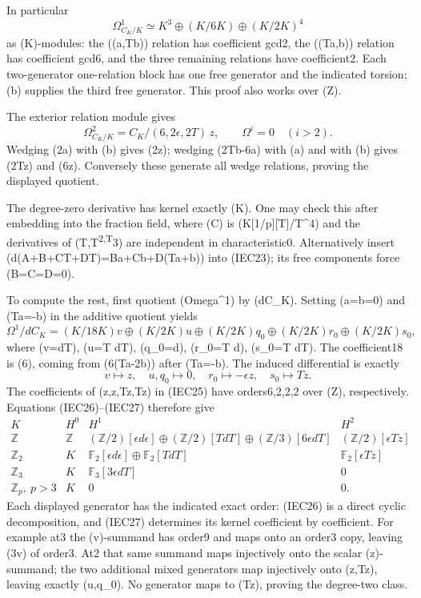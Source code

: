 \documentclass[
  10pt,
]{article}
\begin{document}
In particular \[
\Omega^1_{C_K/K}\simeq K^3\oplus(K/6K)\oplus(K/2K)^4
\tag{IEC24}
\] as (K)-modules: the ((a,Tb)) relation has coefficient gcd2, the
((Ta,\epsilon b)) relation has coefficient gcd6, and the three remaining
relations have coefficient2. Each two-generator one-relation block has
one free generator and the indicated torsion; (b) supplies the third
free generator. This proof also works over (\mathbb Z).

The exterior relation module gives \[
\Omega^2_{C_K/K}=C_K/(6,2\epsilon,2T)\,z,
\qquad\Omega^i=0\quad(i>2).
\tag{IEC25}
\] Wedging (2\epsilon a) with (b) gives (2\epsilon z); wedging (2Tb-6a)
with (a) and with (b) gives (2Tz) and (6z). Conversely these generate
all wedge relations, proving the displayed quotient.

The degree-zero derivative has kernel exactly (K). One may check this
after embedding into the fraction field, where (C) is
(K{[}1/p{]}{[}T{]}/T\^{}4) and the derivatives of
(T,T\textsuperscript{2,T}3) are independent in characteristic0.
Alternatively insert
(d(A+B\epsilon+CT+D\epsilon T)=Ba+Cb+D(Ta+\epsilon b)) into (IEC23); its
free components force (B=C=D=0).

To compute the rest, first quotient (Omega\^{}1) by (dC\_K). Setting
(a=b=0) and (Ta=-\epsilon b) in the additive quotient yields \[
\Omega^1/dC_K=(K/18K)v\oplus(K/2K)u\oplus(K/2K)q_0
\oplus(K/2K)r_0\oplus(K/2K)s_0,
\tag{IEC26}
\] where (v=\epsilon dT), (u=T dT), (q\_0=\epsilon d\epsilon),
(r\_0=\epsilon T d\epsilon), (s\_0=\epsilon T dT). The coefficient18 is
(6), coming from (6(Ta-2\epsilon b)) after (Ta=-\epsilon b). The
induced differential is exactly \[
v\mapsto z,\quad u,q_0\mapsto0,\quad
r_0\mapsto-\epsilon z,\quad s_0\mapsto Tz.
\tag{IEC27}
\] The coefficients of (z,\epsilon z,Tz,\epsilon Tz) in (IEC25) have
orders6,2,2,2 over (\mathbb Z), respectively. Equations (IEC26)--(IEC27)
therefore give \[
\begin{array}{c|c|c|c}
K&H^0&H^1&H^2\\\hline
\mathbb Z&\mathbb Z&(\mathbb Z/2)[\epsilon d\epsilon]\oplus(\mathbb Z/2)[T dT]\oplus(\mathbb Z/3)[6\epsilon dT]&(\mathbb Z/2)[\epsilon Tz]\\
\mathbb Z_2&K&\mathbb F_2[\epsilon d\epsilon]\oplus\mathbb F_2[T dT]&\mathbb F_2[\epsilon Tz]\\
\mathbb Z_3&K&\mathbb F_3[3\epsilon dT]&0\\
\mathbb Z_p,\ p>3&K&0&0.
\end{array}
\tag{IEC28}
\] Each displayed generator has the indicated exact order: (IEC26) is a
direct cyclic decomposition, and (IEC27) determines its kernel
coefficient by coefficient. For example at3 the (v)-summand has order9
and maps onto an order3 copy, leaving (3v) of order3. At2 that same
summand maps injectively onto the scalar (z)-summand; the two additional
mixed generators map injectively onto (\epsilon z,Tz), leaving exactly
(u,q\_0). No generator maps to (\epsilon Tz), proving the degree-two
class.
\end{document}
